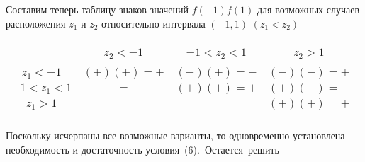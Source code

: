 \begin{multicols*}{2}
Составим теперь таблицу знаков значений $f(-1) f(1)$ для возможных случаев расположения
$z_1$ и $z_2$ относительно интервала $(-1, 1)$
\newline
$(z_1 < z_2)$

\vspace{0.5cm}
\tiny
\setlength\extrarowheight{2pt}    
{\centering
\begin{tabular}{ c | c | c | c }
  & & & \\
  & $z_2 < -1$ & $-1 < z_2 < 1$ & $z_2 > 1$ \\
  & & & \\
  \hline
  $z_1 < -1$ & $(+)(+)=+$ & $(-)(+)=-$ & $(-)(-)=+$ \\
  $-1 < z_1 < 1$ & $-$ & $(+)(+)=+$ & $(+)(-)=-$ \\
  $z_1 > 1$ & $-$ & $-$ & $(+)(+)=+$ \\
  & & & \\
\end{tabular}
}
\normalsize
\vspace{0.35cm}


Поскольку исчерпаны все возможные варианты,
то одновременно установлена необходимость и достаточность \mbox{условия (6).
Остается решить}
\end{multicols*}
